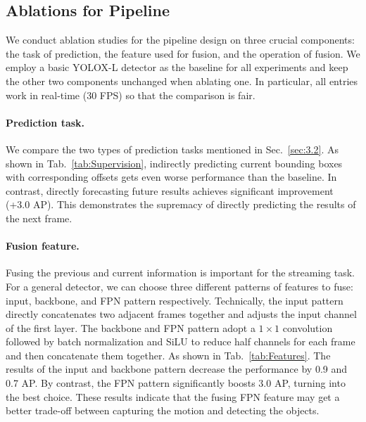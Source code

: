\documentclass[10pt,twocolumn,letterpaper]{article}
\begin{document}
\subsection{Ablations for Pipeline}
We conduct ablation studies for the pipeline design on three crucial components: the task of prediction, the feature used for fusion, and the operation of fusion. We employ a basic YOLOX-L detector as the baseline for all experiments and keep the other two components unchanged when ablating one. In particular, all entries work in real-time (30 FPS) so that the comparison is fair.
\paragraph{Prediction task.}
\label{exp:pred}
We compare the two types of prediction tasks mentioned in Sec.~\ref{sec:3.2}. 
As shown in Tab.~\ref{tab:Supervision}, indirectly predicting current bounding boxes with corresponding offsets gets even worse performance than the baseline. In contrast, directly forecasting future results achieves significant improvement (+3.0 AP). This demonstrates the supremacy of directly predicting the results of the next frame.  

\paragraph{Fusion feature.} Fusing the previous and current information is important for the streaming task. For a general detector, we can choose three different patterns of features to fuse: input, backbone, and FPN pattern respectively. Technically, the input pattern directly concatenates two adjacent frames together and adjusts the input channel of the first layer. The backbone and FPN pattern adopt a $1\times1$ convolution followed by batch normalization and SiLU to reduce half channels for each frame and then concatenate them together. As shown in Tab.~\ref{tab:Features}. The results of the input and backbone pattern decrease the performance by 0.9 and 0.7 AP. By contrast, the FPN pattern significantly boosts 3.0 AP, turning into the best choice. These results indicate that the fusing FPN feature may get a better trade-off between capturing the motion and detecting the objects.
\end{document}
